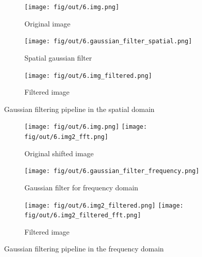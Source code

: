 \documentclass[tikz,14pt,fleqn]{article}
\begin{document}
\begin{figure}[h!]
    \centering
    \begin{subfigure}{0.23\textwidth}
        \centering
        \texttt{[image: fig/out/6.img.png]}
        \caption{Original image}
    \end{subfigure}
    \begin{subfigure}{0.23\textwidth}
        \centering
        \texttt{[image: fig/out/6.gaussian\_filter\_spatial.png]}
        \caption{Spatial gaussian filter}
    \end{subfigure}
    \begin{subfigure}{0.23\textwidth}
        \centering
        \texttt{[image: fig/out/6.img\_filtered.png]}
        \caption{Filtered image}
    \end{subfigure}
    \caption{Gaussian filtering pipeline in the spatial domain}
    \label{fig:ex6-spatial}
\end{figure}
\begin{figure}[h!]
    \centering
    \begin{subfigure}{0.32\textwidth}
        \centering
        \texttt{[image: fig/out/6.img.png]}
        \texttt{[image: fig/out/6.img2\_fft.png]}
        \caption{Original shifted image}
    \end{subfigure}
    \begin{subfigure}{0.32\textwidth}
        \centering
        \texttt{[image: fig/out/6.gaussian\_filter\_frequency.png]}
        \caption{Gaussian filter for frequency domain}
    \end{subfigure}
    \begin{subfigure}{0.32\textwidth}
        \centering
        \texttt{[image: fig/out/6.img2\_filtered.png]}
        \texttt{[image: fig/out/6.img2\_filtered\_fft.png]}
        \caption{Filtered image}
    \end{subfigure}
    \caption{Gaussian filtering pipeline in the frequency domain}
    \label{fig:ex6-frequency}
\end{figure}
\end{document}
